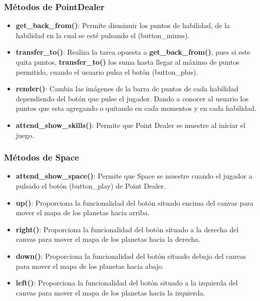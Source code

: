 \documentclass[a4paper,10pt]{article}
\begin{document}
\subsubsection{Métodos de PointDealer}
\begin{itemize}
 \item \textbf{get\_back\_from()}: Permite disminuir los puntos de habilidad, 
 de la habilidad en la cual se esté pulsando el (button\_minus).
 \item \textbf{transfer\_to()}: Realiza la tarea opuesta a \textbf{get\_back\_from()}, pues si este quita puntos, 
 \textbf{transfer\_to()} los suma hasta llegar al máximo de puntos permitido, cuando el usuario pulsa el botón (button\_plus).
 \item \textbf{render()}: Cambia las imágenes de la barra de puntos de cada habilidad dependiendo del botón que pulse el jugador. 
 Dando a conocer al usuario los puntos que esta agregando o quitando en cada momentos y en cada habilidad.
 \item \textbf{attend\_show\_skills()}: Permite que Point Dealer se muestre al iniciar el juego.
\end{itemize}


\subsubsection{Métodos de Space}
\begin{itemize}
 \item \textbf{attend\_show\_space()}: Permite que Space se muestre cuando el jugador a pulsado el botón (button\_play)  de Point Dealer.
 \item \textbf{up()}: Proporciona la funcionalidad del botón situado encima del canvas para mover el mapa de los planetas hacia arriba.
 \item \textbf{right()}: Proporciona la funcionalidad del botón situado a la derecha del canvas para mover el mapa de los planetas hacia la derecha.
 \item \textbf{down()}: Proporciona la funcionalidad del botón situado debajo del canvas para mover el mapa de los planetas hacia abajo.
 \item \textbf{left()}: Proporciona la funcionalidad del botón situado a la izquierda del canvas para mover el mapa de los planetas hacia la izquierda.
\end{itemize}
\end{document}

